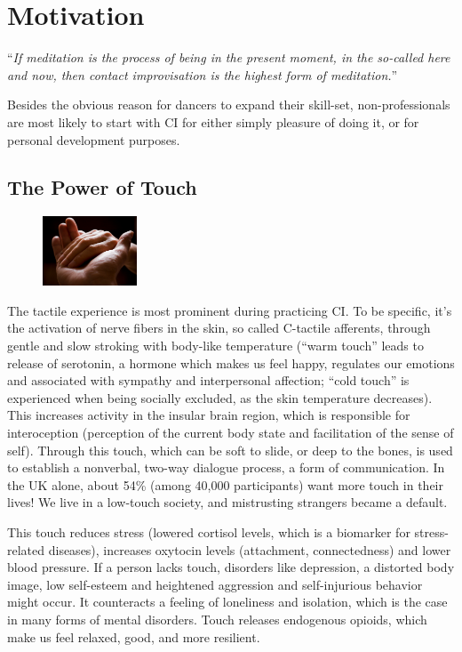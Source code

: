 \section{Motivation}\label{sec:motivation}

``\textit{If meditation is the process of being in the present moment, in the so-called here and now, then contact improvisation is the highest form of meditation.}''

Besides the obvious reason for dancers to expand their skill-set, non-professionals are most likely to start with CI for either simply pleasure of doing it, or for personal development purposes.

\subsection{The Power of Touch}\label{subsec:the-power-of-touch}

\begin{figure}
\centering
\includegraphics[width=0.25\textwidth]{images/motivation}
\end{figure}

The tactile experience is most prominent during practicing CI. To be specific, it's the activation of nerve fibers in the skin, so called C-tactile afferents, through gentle and slow stroking with body-like temperature (``warm touch'' leads to release of serotonin, a hormone which makes us feel happy, regulates our emotions and associated with sympathy and interpersonal affection; ``cold touch'' is experienced when being socially excluded, as the skin temperature decreases).
This increases activity in the insular brain region, which is responsible for interoception (perception of the current body state and facilitation of the sense of self).
Through this touch, which can be soft to slide, or deep to the bones, is used to establish a nonverbal, two-way dialogue process, a form of communication.
In the UK alone, about 54\% (among 40,000 participants) want more touch in their lives!
We live in a low-touch society, and mistrusting strangers became a default.

This touch reduces stress (lowered cortisol levels, which is a biomarker for stress-related diseases), increases oxytocin levels (attachment, connectedness) and lower blood pressure.
If a person lacks touch, disorders like depression, a distorted body image, low self-esteem and heightened aggression and self-injurious behavior might occur.
It counteracts a feeling of loneliness and isolation, which is the case in many forms of mental disorders.
Touch releases endogenous opioids, which make us feel relaxed, good, and more resilient.

